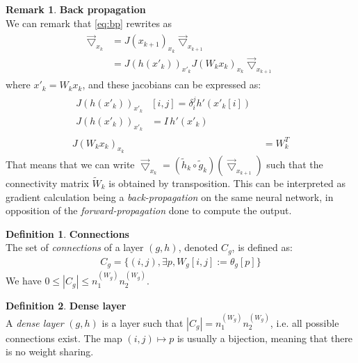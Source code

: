 \documentclass{article}
\theoremstyle{definition}
\newtheorem{definition}{Definition}[section]
\newtheorem{remark}{Remark}
\newcommand{\ovec}{}
\begin{document}
\begin{remark}\textbf{Back propagation}\\

We can remark that \eqref{eq:bp} rewrites as
\begin{align}
  \begin{split}
  \vec{\bigtriangledown}_{x_k} & = J(\ovec{x_{k+1}})_{x_k} \vec{\bigtriangledown}_{x_{k+1}} \\ 
                               & = J(h(x'_k))_{x'_k} J(W_k x_k)_{x_k} \vec{\bigtriangledown}_{x_{k+1}}
  \end{split}
\end{align}
where $x'_k = W_k x_k$, and these jacobians can be expressed as:
\begin{align}
  \begin{split}
  J(h(x'_k))_{x'_k} & [i,j] = \delta_i^j h'(x'_k[i])\\
  J(h(x'_k))_{x'_k} & = I \hspace{2pt} h'(x'_k)
  \end{split}\\
  J(W_k x_k)_{x_k} & = W_k^T
\end{align}
That means that we can write $\vec{\bigtriangledown}_{x_k} = (\widetilde{h}_k \circ \widetilde{g}_k)(\vec{\bigtriangledown}_{x_{k+1}})$ such that the connectivity matrix $\widetilde{W}_k$ is obtained by transposition. This can be interpreted as gradient calculation being a \emph{back-propagation} on the same neural network, in opposition of the \emph{forward-propagation} done to compute the output.
\end{remark}

\begin{definition}\textbf{Connections}\\
The set of \emph{connections} of a layer $(g,h)$, denoted $C_g$, is defined as:
\begin{gather*}
  C_g = \{(i,j), \exists p, W_g[i,j] := \theta_g[p]\}
\end{gather*}
We have $0 \leq |C_g| \leq n_1^{(W_g)} n_2^{(W_g)}$.
\end{definition}

\begin{definition}\textbf{Dense layer}\\
A \textit{dense layer} $(g,h)$ is a layer such that $|C_g| = n_1^{(W_g)} n_2^{(W_g)}$, i.e. all possible connections exist. The map $(i,j) \mapsto p$ is usually a bijection, meaning that there is no weight sharing.
\end{definition}
\end{document}
